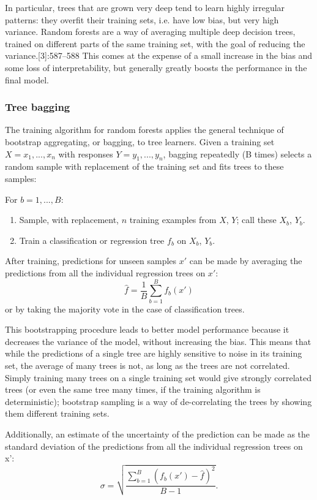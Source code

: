 \documentclass[document.tex]{subfiles}
\begin{document}
In particular, trees that are grown very deep tend to learn highly irregular patterns: they overfit their training sets, i.e. have low bias, but very high variance. Random forests are a way of averaging multiple deep decision trees, trained on different parts of the same training set, with the goal of reducing the variance.[3]:587–588 This comes at the expense of a small increase in the bias and some loss of interpretability, but generally greatly boosts the performance in the final model.

\subsubsection{Tree bagging}
The training algorithm for random forests applies the general technique of bootstrap aggregating, or bagging, to tree learners. Given a training set $X = x_1, ..., x_n$ with responses $Y = y_1, ..., y_n$, bagging repeatedly (B times) selects a random sample with replacement of the training set and fits trees to these samples:

For $b = 1, ..., B:$
\begin{enumerate}
	\item Sample, with replacement, $n$ training examples from $X$, $Y$; call these $X_b$, $Y_b$.
	\item Train a classification or regression tree $f_b$ on $X_b$, $Y_b$.
\end{enumerate}

After training, predictions for unseen samples $x'$ can be made by averaging the predictions from all the individual regression trees on $x'$:
\begin{equation}
{\displaystyle {\hat {f}}={\frac {1}{B}}\sum _{b=1}^{B}f_{b}(x')} 
\end{equation}
or by taking the majority vote in the case of classification trees.

This bootstrapping procedure leads to better model performance because it decreases the variance of the model, without increasing the bias. This means that while the predictions of a single tree are highly sensitive to noise in its training set, the average of many trees is not, as long as the trees are not correlated. Simply training many trees on a single training set would give strongly correlated trees (or even the same tree many times, if the training algorithm is deterministic); bootstrap sampling is a way of de-correlating the trees by showing them different training sets.

Additionally, an estimate of the uncertainty of the prediction can be made as the standard deviation of the predictions from all the individual regression trees on x':
\begin{equation}
{\displaystyle \sigma ={\sqrt {\frac {\sum _{b=1}^{B}(f_{b}(x')-{\hat {f}})^{2}}{B-1}}}.}
\end{equation}
\end{document}
